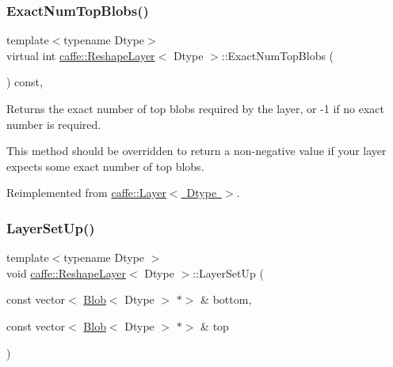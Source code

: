 \subsubsection{\texorpdfstring{Exact\+Num\+Top\+Blobs()}{ExactNumTopBlobs()}\hspace{0.1cm}{\footnotesize\ttfamily [2/2]}}
{\footnotesize\ttfamily template$<$typename Dtype$>$ \\
virtual int \mbox{\hyperlink{classcaffe_1_1_reshape_layer}{caffe\+::\+Reshape\+Layer}}$<$ Dtype $>$\+::Exact\+Num\+Top\+Blobs (\begin{DoxyParamCaption}{ }\end{DoxyParamCaption}) const\hspace{0.3cm}{\ttfamily [inline]}, {\ttfamily [virtual]}}



Returns the exact number of top blobs required by the layer, or -\/1 if no exact number is required. 

This method should be overridden to return a non-\/negative value if your layer expects some exact number of top blobs. 

Reimplemented from \mbox{\hyperlink{classcaffe_1_1_layer_a64e2ca72c719e4b2f1f9216ccfb0d37f}{caffe\+::\+Layer$<$ Dtype $>$}}.

\mbox{\label{classcaffe_1_1_reshape_layer_a99db2601ec64ff20880641b6f6429947}} 
\subsubsection{\texorpdfstring{Layer\+Set\+Up()}{LayerSetUp()}\hspace{0.1cm}{\footnotesize\ttfamily [1/2]}}
{\footnotesize\ttfamily template$<$typename Dtype $>$ \\
void \mbox{\hyperlink{classcaffe_1_1_reshape_layer}{caffe\+::\+Reshape\+Layer}}$<$ Dtype $>$\+::Layer\+Set\+Up (\begin{DoxyParamCaption}\item[{const vector$<$ \mbox{\hyperlink{classcaffe_1_1_blob}{Blob}}$<$ Dtype $>$ $\ast$$>$ \&}]{bottom,  }\item[{const vector$<$ \mbox{\hyperlink{classcaffe_1_1_blob}{Blob}}$<$ Dtype $>$ $\ast$$>$ \&}]{top }\end{DoxyParamCaption})\hspace{0.3cm}{\ttfamily [virtual]}}



